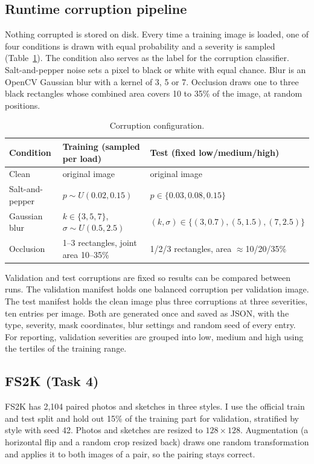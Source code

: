 \documentclass[journal,onecolumn,12pt,a4paper]{IEEEtran}
\let\oldsubsection\subsection
\renewcommand{\subsection}[1]{\oldsubsection{\textbf{#1}}}
\begin{document}
\subsection{Runtime corruption pipeline}
Nothing corrupted is stored on disk. Every time a training image is loaded, one of four conditions is drawn with equal probability and a severity is sampled (Table~\ref{tab:corr}). The condition also serves as the label for the corruption classifier. Salt-and-pepper noise sets a pixel to black or white with equal chance. Blur is an OpenCV Gaussian blur with a kernel of 3, 5 or 7. Occlusion draws one to three black rectangles whose combined area covers 10 to 35\% of the image, at random positions.

\begin{table}[t]
\centering\caption{Corruption configuration.}\label{tab:corr}
\small
\begin{tabular}{p{2.6cm}p{5.4cm}p{6.2cm}}
\toprule
Condition & Training (sampled per load) & Test (fixed low/medium/high) \\
\midrule
Clean & original image & original image \\
Salt-and-pepper & $p\sim U(0.02,0.15)$ & $p\in\{0.03,0.08,0.15\}$ \\
Gaussian blur & $k\in\{3,5,7\}$, $\sigma\sim U(0.5,2.5)$ & $(k,\sigma)\in\{(3,0.7),(5,1.5),(7,2.5)\}$ \\
Occlusion & 1--3 rectangles, joint area 10--35\% & 1/2/3 rectangles, area $\approx$10/20/35\% \\
\bottomrule
\end{tabular}
\end{table}

Validation and test corruptions are fixed so results can be compared between runs. The validation manifest holds one balanced corruption per validation image. The test manifest holds the clean image plus three corruptions at three severities, ten entries per image. Both are generated once and saved as JSON, with the type, severity, mask coordinates, blur settings and random seed of every entry. For reporting, validation severities are grouped into low, medium and high using the tertiles of the training range.

\subsection{FS2K (Task 4)}
FS2K \cite{fan2022fs2k} has 2{,}104 paired photos and sketches in three styles. I use the official train and test split and hold out 15\% of the training part for validation, stratified by style with seed 42. Photos and sketches are resized to $128\times128$. Augmentation (a horizontal flip and a random crop resized back) draws one random transformation and applies it to both images of a pair, so the pairing stays correct.
\end{document}
